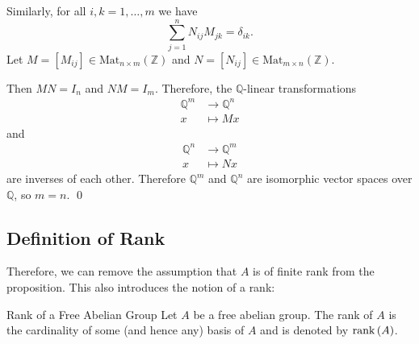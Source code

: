 \documentclass{article}
\renewenvironment{proof}{{\bfseries\color{blue1} Proof:}}{\qed}
\begin{document}
\begin{proof}
    Similarly, for all $i,k=1,\dots, m$ we have
    \begin{equation}
        \sum_{j=1}^n N_{ij}M_{jk} = \delta_{ik}.
    \end{equation}
    Let $M=[M_{ij}] \in \text{Mat}_{n\times m}(\mathbb{Z})$ and $N=[N_{ij}]\in \text{Mat}_{m\times n}(\mathbb{Z})$.

    Then $MN=I_n$ and $NM=I_m$. Therefore, the $\mathbb{Q}$-linear transformations
    \begin{align*}
        \mathbb{Q}^m &\rightarrow \mathbb{Q}^n \\ 
        x &\mapsto Mx
    \end{align*}
    and 
    \begin{align*}
        \mathbb{Q}^n &\rightarrow \mathbb{Q}^m \\ 
        x &\mapsto Nx
    \end{align*}
    are inverses of each other. Therefore $\mathbb{Q}^m$ and $\mathbb{Q}^n$ are isomorphic vector spaces over $\mathbb{Q}$, so $m=n$.
\end{proof}
\subsection{Definition of Rank}
Therefore, we can remove the assumption that $A$ is of finite rank from the proposition. This also introduces the notion of a rank:
\begin{definition}{Rank of a Free Abelian Group}
    Let $A$ be a free abelian group. The rank of $A$ is the cardinality of some (and hence any) basis of $A$ and is denoted by $\mathrm{rank}\,(A)$.
\end{definition}
\end{document}
